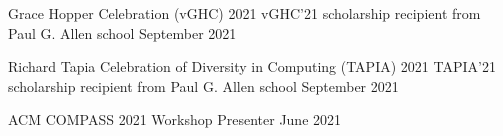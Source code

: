 

\begin{cventries}


  \cvpub
    {Grace Hopper Celebration (vGHC) 2021}
    {vGHC'21 scholarship recipient from Paul G. Allen school} %
    {} %
    {September 2021} %

 \cvpub
    {Richard Tapia Celebration of Diversity in Computing (TAPIA) 2021} %
    {TAPIA'21 scholarship recipient from Paul G. Allen school} %
    {} 
    {September 2021} %
    

 \cvpub
    {ACM COMPASS 2021} %
    {Workshop Presenter} %
    {} 
    {June 2021} %
    
\end{cventries}

   